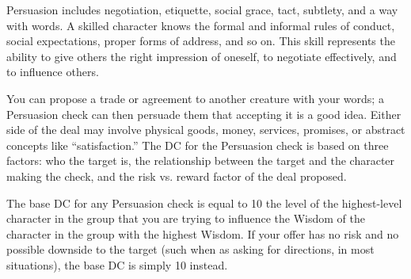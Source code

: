 Persuasion includes negotiation, etiquette, social grace, tact, subtlety, and a way with words. A skilled character knows the formal and informal rules of conduct, social expectations, proper forms of address, and so on. This skill represents the ability to give others the right impression of oneself, to negotiate effectively, and to influence others.

 You can propose a trade or agreement to another creature with your words; a Persuasion check can then persuade them that accepting it is a good idea. Either side of the deal may involve physical goods, money, services, promises, or abstract concepts like ``satisfaction.'' The DC for the Persuasion check is based on three factors: who the target is, the relationship between the target and the character making the check, and the risk vs. reward factor of the deal proposed.

\par The base DC for any Persuasion check is equal to 10 \add the level of the highest-level character in the group that you are trying to influence \add the Wisdom of the character in the group with the highest Wisdom. If your offer has no risk and no possible downside to the target (such when as asking for directions, in most situations), the base DC is simply 10 instead.

